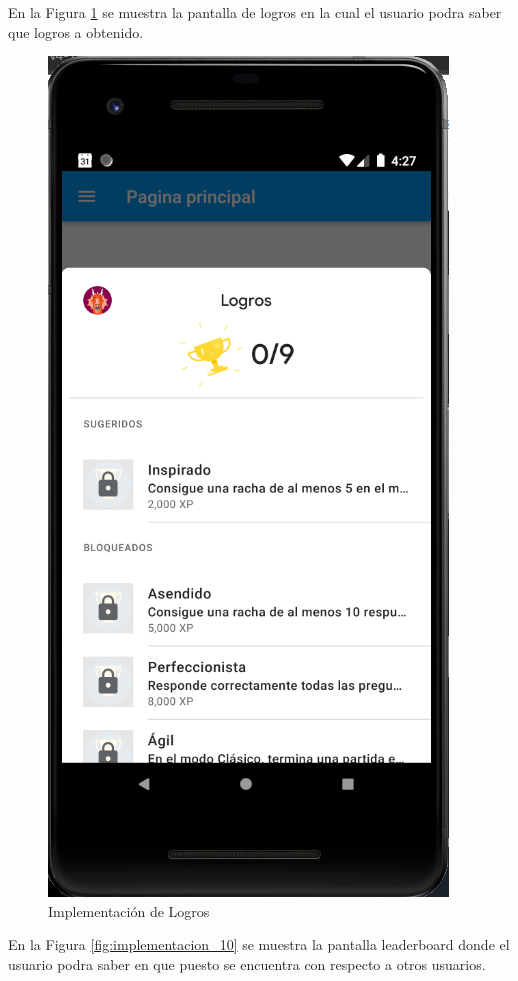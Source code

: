\documentclass{article}
\begin{document}
En la Figura \ref{fig:implementacion_09} se muestra la pantalla de logros en la cual
el usuario podra saber que logros a obtenido.

\begin{figure}[H]
    \centering
    \includegraphics[scale=0.8]{imgs/Imp/Logros}
    \caption{Implementación de Logros}
    \label{fig:implementacion_09}
\end{figure}

En la Figura \ref{fig:implementacion_10} se muestra la pantalla leaderboard donde 
el usuario podra saber en que puesto se encuentra con respecto a otros usuarios.
\end{document}
